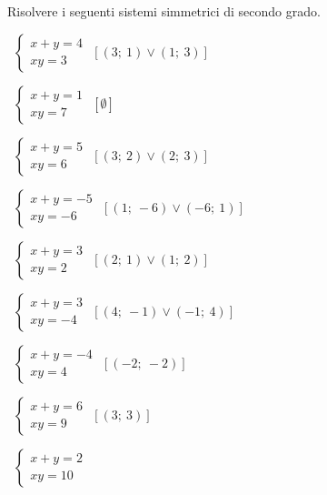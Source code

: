 \begin{esercizio}[\Ast]
 \label{ese:6.14}
Risolvere i seguenti sistemi simmetrici di secondo grado.
\begin{multicols}{2}
 \begin{enumeratea}
 \item~\(\left\{\begin{array}{l}x+y=4\\{xy}=3\end{array}\right.\)
  \hfill\(\left[(3;~1)\vee(1;~3)\right]\)
 \item~\(\left\{\begin{array}{l}x+y=1\\{xy}=7 \end{array}\right.\)
  \hfill\(\left[\emptyset\right]\)
 \item~\(\left\{\begin{array}{l}x+y=5\\{xy}=6 \end{array}\right.\)
  \hfill\(\left[(3;~2)\vee(2;~3)\right]\)
 \item~\(\left\{\begin{array}{l}x+y=-5\\{xy}=-6 \end{array}\right.\)
  \hfill\(\left[(1;~-6)\vee(-6;~1)\right]\)
 \item~\(\left\{\begin{array}{l}x+y=3\\{xy}=2 \end{array}\right.\)
  \hfill\(\left[(2;~1)\vee(1;~2)\right]\)
 \item~\(\left\{\begin{array}{l}x+y=3\\{xy}=-4\end{array}\right.\)
  \hfill\(\left[(4;~-1)\vee(-1;~4)\right]\)
 \item~\(\left\{\begin{array}{l}x+y=-4\\{xy}=4 \end{array}\right.\)
  \hfill\(\left[(-2;~-2)\right]\)
 \item~\(\left\{\begin{array}{l}x+y=6\\{xy}=9 \end{array}\right.\)
  \hfill\(\left[(3;~3)\right]\)
 \item~\(\left\{\begin{array}{l}x+y=2\\{xy}=10 \end{array}\right.\)

\end{enumeratea}
\end{multicols}
\end{esercizio}
